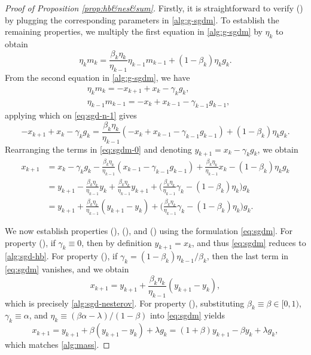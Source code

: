 \documentclass[10pt]{article}
\numberwithin{equation}{section}
\theoremstyle{definition}
\begin{document}
\begin{proof}[Proof of Proposition \ref{prop:hb&nes&sum}]
    Firstly, it is straightforward to verify () by plugging the corresponding parameters in \eqref{alg:g-sgdm}. To establish the remaining properties, we multiply the first equation in \eqref{alg:g-sgdm} by $\eta_k$ to obtain
    \begin{equation}\label{eq:sgd-n-1}
        \eta_k m_k=\frac{\beta_k \eta_k}{\eta_{k-1}} \eta_{k-1} m_{k-1}+(1-\beta_k)\eta_k g_k.
    \end{equation}
    From the second equation in \eqref{alg:g-sgdm}, we have
    \begin{align*}
        &\eta_k m_k = - x_{k+1} + x_k - \gamma_k g_k,\\
        & \eta_{k-1} m_{k-1} = - x_k + x_{k-1} - \gamma_{k-1} g_{k-1},
    \end{align*}
    applying which on \eqref{eq:sgd-n-1} gives
    \begin{equation}\label{eq:sgdm-0}
        - x_{k+1} + x_k - \gamma_k g_k = \frac{\beta_k \eta_k}{\eta_{k-1}}(- x_k + x_{k-1} - \gamma_{k-1} g_{k-1}) + (1-\beta_k)\eta_k g_k.  
    \end{equation}
    Rearranging the terms in \eqref{eq:sgdm-0} and denoting $y_{k+1}=x_k - \gamma_k g_k$, we obtain
    \begin{equation}\label{eq:sgdm}
        \begin{aligned}
           x_{k+1} &= x_k - \gamma_k g_k - \frac{\beta_k \eta_k}{\eta_{k-1}}(x_{k-1} - \gamma_{k-1} g_{k-1}) + \frac{\beta_k \eta_k}{\eta_{k-1}}x_k - (1-\beta_k)\eta_k g_k\\
           & = y_{k+1} - \frac{\beta_k \eta_k}{\eta_{k-1}}y_k + \frac{\beta_k \eta_k}{\eta_{k-1}} y_{k+1} + \Big(\frac{\beta_k \eta_k}{\eta_{k-1}}\gamma_k-(1-\beta_k)\eta_k\Big) g_k\\
           & = y_{k+1} + \frac{\beta_k \eta_k}{\eta_{k-1}} (y_{k+1} - y_k) + \Big(\frac{\beta_k \eta_k}{\eta_{k-1}}\gamma_k-(1-\beta_k)\eta_k\Big) g_k.
        \end{aligned}
    \end{equation}
    
    We now establish properties (), (), and () using the formulation \eqref{eq:sgdm}. For property (), if $\gamma_k\equiv 0$, then by definition $y_{k+1}=x_k$, and thus \eqref{eq:sgdm} reduces to \eqref{alg:sgd-hb}. 
    For property (), if $\gamma_k=(1-\beta_k)\eta_{k-1}/\beta_k$, then the last term in \eqref{eq:sgdm} vanishes, and we obtain
    \[
    x_{k+1} = y_{k+1} + \frac{\beta_k \eta_k}{\eta_{k-1}} (y_{k+1} - y_k),
    \]
    which is precisely \eqref{alg:sgd-nesterov}. For property (), substituting $\beta_k\equiv\beta\in[0,1)$, $\gamma_k\equiv \alpha$, and $\eta_k\equiv (\beta\alpha-\lambda)/(1-\beta)$ into \eqref{eq:sgdm} yields
    \[
    x_{k+1} =y_{k+1} + \beta(y_{k+1} - y_k) + \lambda g_k=(1+\beta)y_{k+1} - \beta y_k + \lambda g_k,
    \]
    which matches \eqref{alg:mass}.


\end{proof}
\end{document}
